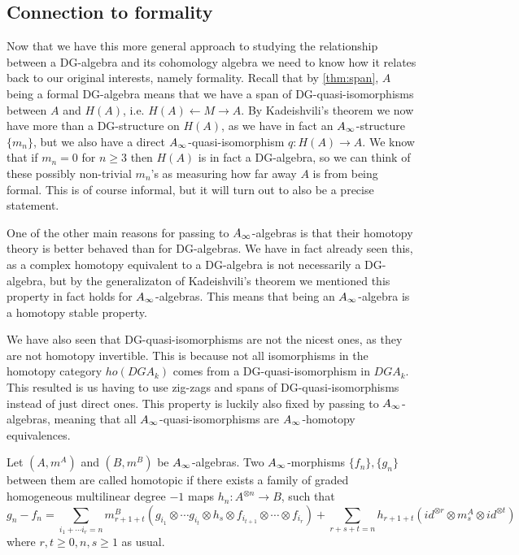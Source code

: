 \subsection{Connection to formality}

Now that we have this more general approach to studying the relationship between a DG-algebra and its cohomology algebra we need to know how it relates back to our original interests, namely formality. Recall that by \cref{thm:span}, $A$ being a formal DG-algebra means that we have a span of DG-quasi-isomorphisms between $A$ and $H(A)$, i.e. $H(A)\longleftarrow M\longrightarrow A$. By Kadeishvili's theorem we now have more than a DG-structure on $H(A)$, as we have in fact an $\A$-structure $\{m_n\}$, but we also have a direct $\A$-quasi-isomorphism $q\colon H(A)\longrightarrow A$. We know that if $m_n = 0$ for $n\geq 3$ then $H(A)$ is in fact a DG-algebra, so we can think of these possibly non-trivial $m_n$'s as measuring how far away $A$ is from being formal. This is of course informal, but it will turn out to also be a precise statement. 

One of the other main reasons for passing to $\A$-algebras is that their homotopy theory is better behaved than for DG-algebras. We have in fact already seen this, as a complex homotopy equivalent to a DG-algebra is not necessarily a DG-algebra, but by the generalizaton of Kadeishvili's theorem we mentioned this property in fact holds for $\A$-algebras. This means that being an $\A$-algebra is a homotopy stable property. 

We have also seen that DG-quasi-isomorphisms are not the nicest ones, as they are not homotopy invertible. This is because not all isomorphisms in the homotopy category $ho(DGA_k)$ comes from a DG-quasi-isomorphism in $DGA_k$. This resulted is us having to use zig-zags and spans of DG-quasi-isomorphisms instead of just direct ones. This property is luckily also fixed by passing to $\A$-algebras, meaning that all $\A$-quasi-isomorphisms are $\A$-homotopy equivalences. 


\begin{definition}[$\A$-homotopy]
Let $(A, m^A)$ and $(B, m^B)$ be $\A$-algebras. Two $\A$-morphisms $\{f_n\}, \{g_n\}$ between them are called homotopic if there exists a family of graded homogeneous multilinear degree $-1$ maps $h_n:A^{\otimes n}\longrightarrow B$, such that 
\begin{equation*}
    g_n-f_n = \sum_{i_1+\cdots i_r = n}m^B_{r+1+t} (g_{i_1}\otimes \cdots g_{i_t}\otimes h_s \otimes f_{i_{t+1}}\otimes \cdots \otimes f_{i_r} ) + \sum_{r+s+t = n}h_{r+1+t} (id^{\otimes r}\otimes m^A_s \otimes id^{\otimes t})
\end{equation*}
where $r, t\geq 0, n, s\geq 1$ as usual. 
\end{definition}


